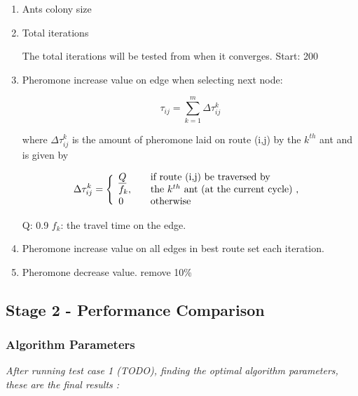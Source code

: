 \begin{enumerate}
\item Ants colony size
\item Total iterations

The total iterations will be tested from when it converges. Start: 200

\item Pheromone increase value on edge when selecting next node:

$$ \tau_{ij} = \sum_{k=1}^{m} \Delta \tau^k_{ij}$$

where $ \Delta \tau^k_{ij} $ is the amount of pheromone laid on route (i,j) by the $k^{th}$ ant and is given by

$$
\Delta \tau^k_{ij} = \Bigg\{
\begin{array}{l l}
\underline{Q} &  \quad \text{if route (i,j) be traversed by}\\
f_k, &  \quad \text{the $k^{th}$ ant (at the current cycle) , }\\
0 &  \quad \text{otherwise}
\end{array}
$$

Q: 0.9
\newline
$f_k$: the travel time on the edge.

\item Pheromone increase value on all edges in best route set each iteration.
\item Pheromone decrease value. remove 10\%

\end{enumerate}

\subsection{Stage 2 - Performance Comparison}

\subsubsection{Algorithm Parameters}
\emph{\color{red} After running test case 1 (TODO), finding the optimal algorithm parameters, these are the final results :}

